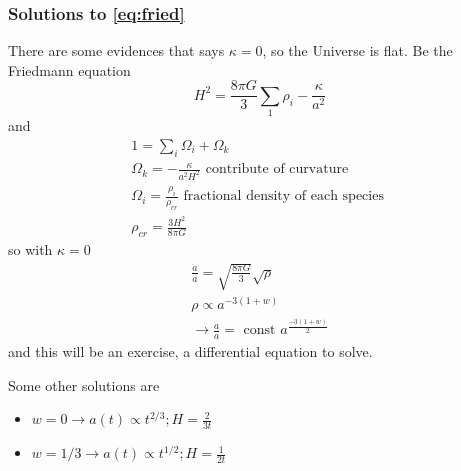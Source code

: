 \subsubsection{Solutions to \ref{eq:fried}}
There are some evidences that says $\kappa =0$, so the Universe is flat. Be the Friedmann equation
\[
H^{2} = \frac{8\pi G}{3}\sum_{1}^{}{\rho _{i}} - \frac{\kappa }{a^{2}}
\]
and
\begin{gather*}
1 = \sum_{i}^{}{\Omega _{i}} + \Omega _{k} \\
\Omega _{k} = - \frac{\kappa }{a^{2}H^{2}} \text{ contribute of curvature }\\
\Omega _{i} = \frac{\rho _{i}}{\rho _{cr}} \text{ fractional density of each species }\\
\rho _{ cr} = \frac{3H^{2}}{8\pi G}
\end{gather*}
so with $\kappa  = 0$	
\begin{gather*}
\frac{\dot{a}}{a} = \sqrt{ \frac{8\pi G}{3}} \sqrt{\rho } \\
\rho \propto a ^{ -3 \left( 1+w \right)}\\
\to  \frac{\dot{a}}{a} = \text{ const } a^{ \frac{-3 \left( 1+w \right)}{2}} 
\end{gather*}
and this will be an exercise, a differential equation to solve. 

Some other solutions are
\begin{itemize}
\item $w =0 \to  a\left( t \right) \propto t^{2/3}; H = \frac{2}{3t} $
\item $w = 1/3 \to  a\left( t \right) \propto t^{1/2}; H = \frac{1}{2t}$
\end{itemize}











































